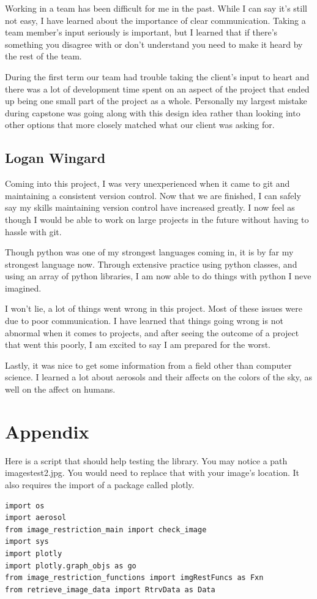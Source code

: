 \documentclass[onecolumn, draftclsnofoot,10pt, compsoc]{IEEEtran}
\begin{document}
\begin{singlespace}
			Working in a team has been difficult for me in the past.
			While I can say it's still not easy, I have learned about the importance of clear communication.
			Taking a team member's input seriously is important, but I learned that if there's something you disagree with or don't understand you need to make it heard by the rest of the team.

			During the first term our team had trouble taking the client's input to heart and there was a lot of development time spent on an aspect of the project that ended up being one small part of the project as a whole.
			Personally my largest mistake during capstone was going along with this design idea rather than looking into other options that more closely matched what our client was asking for.
		\subsection{Logan Wingard}
			Coming into this project, I was very unexperienced when it came to git and maintaining a consistent version control.
			Now that we are finished, I can safely say my skills maintaining version control have increased greatly.
			I now feel as though I would be able to work on large projects in the future without having to hassle with git.
			
			Though python was one of my strongest languages coming in, it is by far my strongest language now.
			Through extensive practice using python classes, and using an array of python libraries, I am now able to do things with python I neve imagined.
			
			I won't lie, a lot of things went wrong in this project. 
			Most of these issues were due to poor communication.
			I have learned that things going wrong is not abnormal when it comes to projects, and after seeing the outcome of a project that went this poorly, I am excited to say I am prepared for the worst.
			
			Lastly, it was nice to get some information from a field other than computer science.
			I learned a lot about aerosols\cite{allen_2015} and their affects on the colors of the sky, as well on the affect on humans.
	\section{Appendix}
		Here is a script that should help testing the library.
		You may notice a path \/images\/test2.jpg.
		You would need to replace that with your image's location.
		It also requires the import of a package called plotly.
		\begin{lstlisting}
import os
import aerosol
from image_restriction_main import check_image
import sys
import plotly
import plotly.graph_objs as go
from image_restriction_functions import imgRestFuncs as Fxn
from retrieve_image_data import RtrvData as Data


\end{lstlisting}
\end{singlespace}
\end{document}
